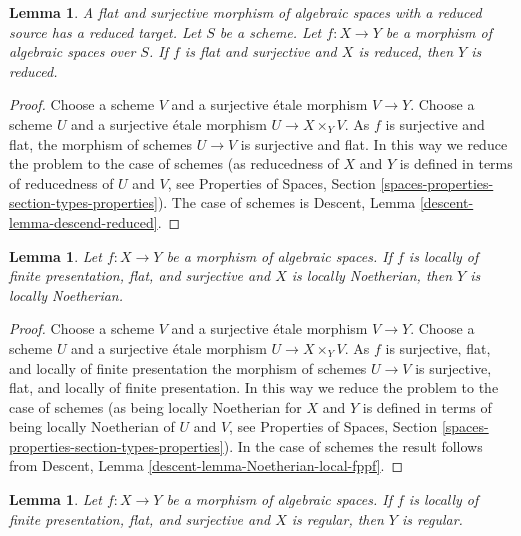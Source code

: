 \documentclass{stacks-project}
\newenvironment{slogan}{\comment}{\endcomment}
\theoremstyle{plain}
\newtheorem{lemma}[subsection]{Lemma}
\theoremstyle{definition}
\theoremstyle{remark}
\numberwithin{equation}{subsection}
\begin{document}
\begin{lemma}
\label{lemma-descend-reduced}
\begin{slogan}
A flat and surjective morphism of algebraic spaces with a reduced source
has a reduced target.
\end{slogan}
Let $S$ be a scheme.
Let $f : X \to Y$ be a morphism of algebraic spaces over $S$.
If $f$ is flat and surjective and $X$ is reduced, then $Y$ is reduced.
\end{lemma}

\begin{proof}
Choose a scheme $V$ and a surjective \'etale morphism $V \to Y$.
Choose a scheme $U$ and a surjective \'etale morphism
$U \to X \times_Y V$. As $f$ is surjective and flat, the morphism of
schemes $U \to V$ is surjective and flat. In this way we reduce the
problem to the case of schemes (as reducedness of $X$ and $Y$ is defined
in terms of reducedness of $U$ and $V$, see
Properties of Spaces,
Section \ref{spaces-properties-section-types-properties}).
The case of schemes is
Descent, Lemma \ref{descent-lemma-descend-reduced}.
\end{proof}

\begin{lemma}
\label{lemma-descend-locally-Noetherian}
Let $f : X \to Y$ be a morphism of algebraic spaces.
If $f$ is locally of finite presentation, flat, and surjective and
$X$ is locally Noetherian, then $Y$ is locally Noetherian.
\end{lemma}

\begin{proof}
Choose a scheme $V$ and a surjective \'etale morphism $V \to Y$.
Choose a scheme $U$ and a surjective \'etale morphism
$U \to X \times_Y V$. As $f$ is surjective, flat, and locally of
finite presentation the morphism of schemes $U \to V$ is surjective, flat, and
locally of finite presentation. In this way we reduce the
problem to the case of schemes (as being locally Noetherian for $X$ and $Y$
is defined in terms of being locally Noetherian of $U$ and $V$, see
Properties of Spaces,
Section \ref{spaces-properties-section-types-properties}).
In the case of schemes the result follows from
Descent, Lemma \ref{descent-lemma-Noetherian-local-fppf}.
\end{proof}

\begin{lemma}
\label{lemma-descend-regular}
Let $f : X \to Y$ be a morphism of algebraic spaces.
If $f$ is locally of finite presentation, flat, and surjective and
$X$ is regular, then $Y$ is regular.
\end{lemma}
\end{document}
